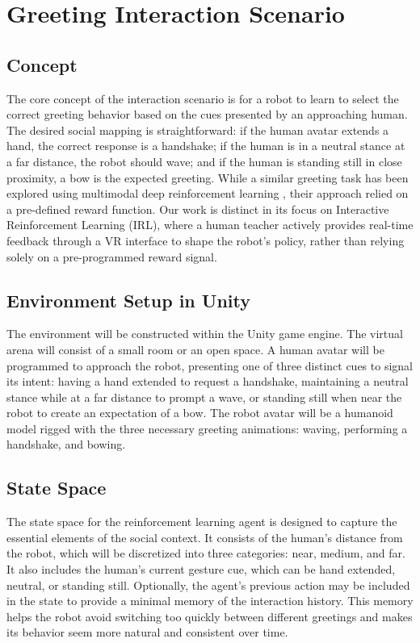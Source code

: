 \documentclass[rnd]{mas_proposal}
\begin{document}
\section{Greeting Interaction Scenario}

\subsection{Concept}
The core concept of the interaction scenario is for a robot to learn to select the correct greeting behavior based on the cues presented by an approaching human. The desired social mapping is straightforward: if the human avatar extends a hand, the correct response is a handshake; if the human is in a neutral stance at a far distance, the robot should wave; and if the human is standing still in close proximity, a bow is the expected greeting. While a similar greeting task has been explored using multimodal deep reinforcement learning \citep{7803357}, their approach relied on a pre-defined reward function. Our work is distinct in its focus on Interactive Reinforcement Learning (IRL), where a human teacher actively provides real-time feedback through a VR interface to shape the robot's policy, rather than relying solely on a pre-programmed reward signal.

\subsection{Environment Setup in Unity}
The environment will be constructed within the Unity game engine. The virtual arena will consist of a small room or an open space. A human avatar will be programmed to approach the robot, presenting one of three distinct cues to signal its intent: having a hand extended to request a handshake, maintaining a neutral stance while at a far distance to prompt a wave, or standing still when near the robot to create an expectation of a bow. The robot avatar will be a humanoid model rigged with the three necessary greeting animations: waving, performing a handshake, and bowing.

\subsection{State Space}
The state space for the reinforcement learning agent is designed to capture the essential elements of the social context. It consists of the human's distance from the robot, which will be discretized into three categories: near, medium, and far. It also includes the human's current gesture cue, which can be hand extended, neutral, or standing still. Optionally, the agent's previous action may be included in the state to provide a minimal memory of the interaction history. This memory helps the robot avoid switching too quickly between different greetings and makes its behavior seem more natural and consistent over time.
\end{document}
